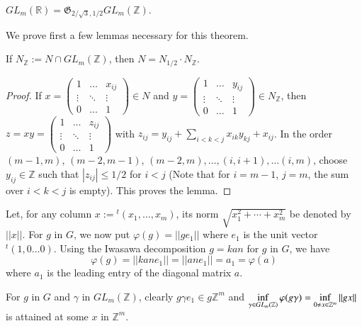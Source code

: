 \begin{subtheorem}\label{c1:thm-1.2.1}
$GL_{m}(\mathbb{R})=\mathfrak{G}_{2/\sqrt{3},1/2}GL_{m}(\mathbb{Z})$.

We prove first a few lemmas necessary for this theorem.
\end{subtheorem}

\setcounter{sublemma}{1}
\begin{sublemma}\label{c1:lem-1.2.2}
If $N_{\mathbb{Z}}:=N\cap GL_{m}(\mathbb{Z})$, then $N=N_{1/2}\cdot
N_{\mathbb{Z}}$. 
\end{sublemma}

\begin{proof}
If $x=\left(\begin{smallmatrix} 1 & \ldots & x_{ij}\\ \vdots & \ddots
  & \vdots\\
0 & \ldots & 1
\end{smallmatrix}\right)\in N$ and $y=\left(\begin{smallmatrix} 1 &
  \ldots & y_{ij}\\ \vdots & \ddots & \vdots\\ 0 & \ldots & 1
\end{smallmatrix}\right)\in N_{\mathbb{Z}}$, then
$z=xy=\left(\begin{smallmatrix} 1 & \ldots & z_{ij}\\ \vdots & \ddots
  & \vdots\\ 0 & \ldots & 1\end{smallmatrix}\right)$ with
  $z_{ij}=y_{ij}+\sum\limits_{i<k<j}x_{ik}y_{kj}+x_{ij}$. In the order
  $(m-1,m)$, $(m-2,m-1)$, $(m-2,m),\ldots,(i,i+1),\ldots(i,m)$, choose
  $y_{ij}\in\mathbb{Z}$ such that $|z_{ij}|\leq 1/2$ for $i<j$ (Note
  that for $i=m-1$, $j=m$, the sum over $i<k<j$ is empty). This proves
  the lemma.
\end{proof}

Let, for any column $x:={}^{t}(x_{1},\ldots,x_{m})$, its norm
$\sqrt{x^{2}_1 + \cdots + x^{2}_{m}}$ be denoted by $||x||$. For $g$ in $G$,
we now put $\varphi(g)=||ge_{1}||$ where $e_{1}$ is the unit vector
${}^{t}(1,0\ldots0)$. Using the Iwasawa decomposition $g=kan$ for $g$
in $G$, we have
$$
\varphi(g)=||kane_{1}||=||ane_{1}||=a_{1}=\varphi(a)
$$
where $a_{1}$ is the leading entry of the diagonal matrix $a$.

\begin{remark*}
For $g$ in $G$ and $\gamma$ in $GL_{m}(\mathbb{Z})$, clearly $g\gamma
e_{1}\in g\mathbb{Z}^{m}$ and $\inf\limits_{\gamma\in
  GL_{m}(\mathbb{Z})}\varphi\break(g\gamma)=\inf\limits_{0\neq x\in
  \mathbb{Z}^{m}}||gx||$ is attained at some $x$ in $\mathbb{Z}^{m}$. 
\end{remark*}

